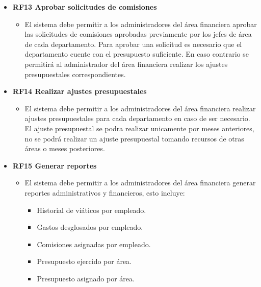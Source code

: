 \begin{itemize}
	\item \textbf{RF13 Aprobar solicitudes de comisiones}
	\begin{itemize}
		\item El sistema debe permitir a los administradores del área financiera aprobar las solicitudes de comisiones aprobadas previamente por los jefes de área de cada departamento. Para aprobar una solicitud es necesario que el departamento cuente con el presupuesto suficiente. En caso contrario se permitirá al administrador del área financiera realizar los ajustes presupuestales correspondientes.
	\end{itemize}

	\item \textbf{RF14 Realizar ajustes presupuestales}
	\begin{itemize}
		\item El sistema debe permitir a los administradores del área financiera realizar ajustes presupuestales para cada departamento en caso de ser necesario. El ajuste presupuestal se podra realizar unicamente por meses anteriores, no se podrá realizar un ajuste presupuestal tomando recursos de otras áreas o meses posteriores.
	\end{itemize}	

	\item \textbf{RF15 Generar reportes}
	\begin{itemize}
		\item El sistema debe permitir a los administradores del área financiera generar reportes administrativos y financieros, esto incluye: 
		\begin{itemize}
			\item Historial de viáticos por empleado.
			\item Gastos desglosados por empleado.
			\item Comisiones asignadas por empleado.
			\item Presupuesto ejercido por área.
			\item Presupuesto asignado por área.
		\end{itemize}
	\end{itemize}	
	
	
\end{itemize}
